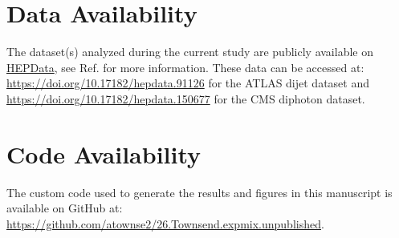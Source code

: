 \documentclass[a4paper,11pt]{article}
\begin{document}
\section*{Data Availability}
The dataset(s) analyzed during the current study are publicly available on \href{https://www.hepdata.net/}{HEPData}, see Ref. \cite{Maguire_2017} for more information. These data can be accessed at: \url{https://doi.org/10.17182/hepdata.91126} for the ATLAS dijet dataset and \url{https://doi.org/10.17182/hepdata.150677} for the CMS diphoton dataset.

\section*{Code Availability}
The custom code used to generate the results and figures in this manuscript is available on GitHub at: \url{https://github.com/atownse2/26.Townsend.expmix.unpublished}.





\end{document}
